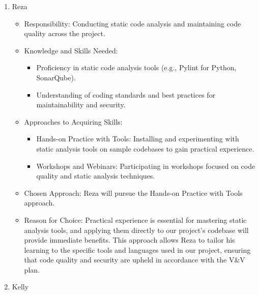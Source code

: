 \documentclass[12pt, titlepage]{article}
\begin{document}
\begin{enumerate}
\begin{enumerate}
  \item Reza

  \begin{itemize}
      \item[-] Responsibility: Conducting static code analysis and maintaining code quality across the project.
      \item[-] Knowledge and Skills Needed:
      \begin{itemize}
          \item Proficiency in static code analysis tools (e.g., Pylint for Python, SonarQube).
          \item Understanding of coding standards and best practices for maintainability and security.
      \end{itemize}
      \item[-] Approaches to Acquiring Skills:
      \begin{itemize}
          \item Hands-on Practice with Tools: Installing and experimenting with static analysis tools on sample codebases to gain practical experience.
          \item Workshops and Webinars: Participating in workshops focused on code quality and static analysis techniques.
      \end{itemize}
      \item[-] Chosen Approach: Reza will pursue the Hands-on Practice with Tools approach.
      \item[-] Reason for Choice: Practical experience is essential for mastering static analysis tools, and applying them directly to our project's codebase will provide immediate benefits. This approach allows Reza to tailor his learning to the specific tools and languages used in our project, ensuring that code quality and security are upheld in accordance with the V\&V plan.
  \end{itemize}

  \item Kelly


\end{enumerate}
\end{enumerate}
\end{document}
